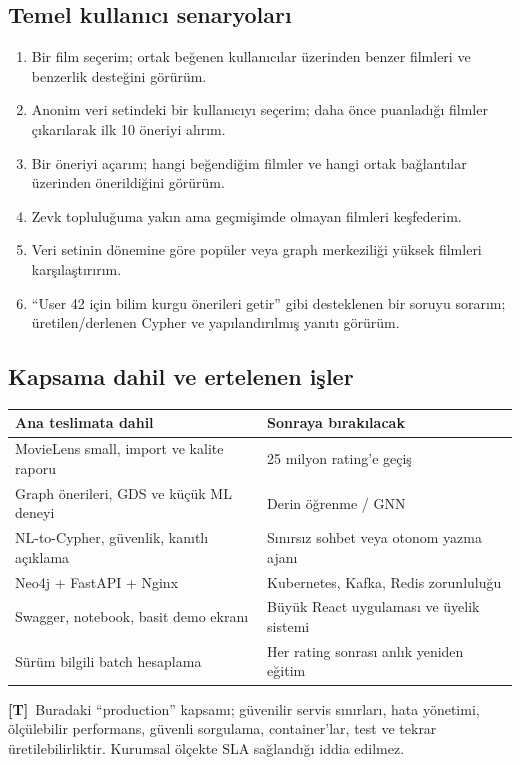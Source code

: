 \documentclass[11pt,a4paper]{article}
\newcommand{\design}{\textbf{[T]}}
\begin{document}
\subsection{Temel kullanıcı senaryoları}
\begin{enumerate}
\item Bir film seçerim; ortak beğenen kullanıcılar üzerinden benzer filmleri ve benzerlik desteğini görürüm.
\item Anonim veri setindeki bir kullanıcıyı seçerim; daha önce puanladığı filmler çıkarılarak ilk 10 öneriyi alırım.
\item Bir öneriyi açarım; hangi beğendiğim filmler ve hangi ortak bağlantılar üzerinden önerildiğini görürüm.
\item Zevk topluluğuma yakın ama geçmişimde olmayan filmleri keşfederim.
\item Veri setinin dönemine göre popüler veya graph merkeziliği yüksek filmleri karşılaştırırım.
\item ``User 42 için bilim kurgu önerileri getir'' gibi desteklenen bir soruyu sorarım; üretilen/derlenen Cypher ve yapılandırılmış yanıtı görürüm.
\end{enumerate}

\subsection{Kapsama dahil ve ertelenen işler}
\begin{tabularx}{\linewidth}{@{}YY@{}}\toprule
\textbf{Ana teslimata dahil} & \textbf{Sonraya bırakılacak}\\\midrule
MovieLens small, import ve kalite raporu & 25 milyon rating'e geçiş\\
Graph önerileri, GDS ve küçük ML deneyi & Derin öğrenme / GNN\\
NL-to-Cypher, güvenlik, kanıtlı açıklama & Sınırsız sohbet veya otonom yazma ajanı\\
Neo4j + FastAPI + Nginx & Kubernetes, Kafka, Redis zorunluluğu\\
Swagger, notebook, basit demo ekranı & Büyük React uygulaması ve üyelik sistemi\\
Sürüm bilgili batch hesaplama & Her rating sonrası anlık yeniden eğitim\\\bottomrule
\end{tabularx}

\design\ Buradaki ``production'' kapsamı; güvenilir servis sınırları, hata yönetimi, ölçülebilir performans, güvenli sorgulama, container'lar, test ve tekrar üretilebilirliktir. Kurumsal ölçekte SLA sağlandığı iddia edilmez.
\end{document}
